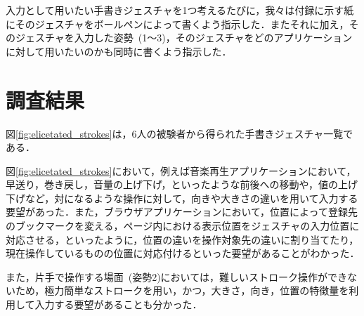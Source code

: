 入力として用いたい手書きジェスチャを1つ考えるたびに，我々は付録に示す紙にそのジェスチャをボールペンによって書くよう指示した．またそれに加え，そのジェスチャを入力した姿勢~(1〜3)，そのジェスチャをどのアプリケーションに対して用いたいのかも同時に書くよう指示した．


\section{調査結果}
図\ref{fig:elicetated_strokes}は，6人の被験者から得られた手書きジェスチャ一覧である．

図\ref{fig:elicetated_strokes}において，例えば音楽再生アプリケーションにおいて，早送り，巻き戻し，音量の上げ下げ，といったような前後への移動や，値の上げ下げなど，対になるような操作に対して，向きや大きさの違いを用いて入力する要望があった．また，ブラウザアプリケーションにおいて，位置によって登録先のブックマークを変える，ページ内における表示位置をジェスチャの入力位置に対応させる，といったように，位置の違いを操作対象先の違いに割り当てたり，現在操作しているものの位置に対応付けるといった要望があることがわかった．

また，片手で操作する場面~(姿勢2)においては，難しいストローク操作ができないため，極力簡単なストロークを用い，かつ，大きさ，向き，位置の特徴量を利用して入力する要望があることも分かった．

